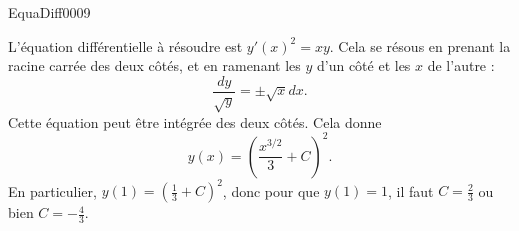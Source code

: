 \begin{corrige}{EquaDiff0009}

L'équation différentielle à résoudre est $y'(x)^2=xy$. Cela se résous en prenant la racine carrée des deux côtés, et en ramenant les $y$ d'un côté et les $x$ de l'autre :
\begin{equation}
	\frac{ dy }{ \sqrt{y} }=\pm\sqrt{x}dx.
\end{equation}
Cette équation peut être intégrée des deux côtés. Cela donne
\begin{equation}
	y(x)=\left( \frac{ x^{3/2} }{ 3 }+C \right)^2.
\end{equation}
En particulier, $y(1)=\left( \frac{1}{ 3 }+C \right)^2$, donc pour que $y(1)=1$, il faut $C=\frac{ 2 }{ 3 }$ ou bien $C=-\frac{ 4 }{ 3 }$.

\end{corrige}
